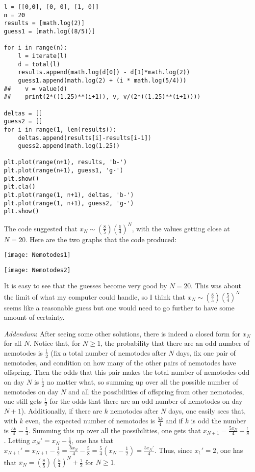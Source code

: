 \documentclass[11pt]{article}
\theoremstyle{definition}
\begin{document}
\begin{verbatim}
l = [[0,0], [0, 0], [1, 0]]
n = 20
results = [math.log(2)]
guess1 = [math.log((8/5))]

for i in range(n):
    l = iterate(l)
    d = total(l)
    results.append(math.log(d[0]) - d[1]*math.log(2))
    guess1.append(math.log(2) + (i * math.log(5/4)))
##    v = value(d)
##    print(2*((1.25)**(i+1)), v, v/(2*((1.25)**(i+1))))
    
deltas = []
guess2 = []
for i in range(1, len(results)):
    deltas.append(results[i]-results[i-1])
    guess2.append(math.log(1.25))

plt.plot(range(n+1), results, 'b-')
plt.plot(range(n+1), guess1, 'g-')
plt.show()
plt.cla()
plt.plot(range(1, n+1), deltas, 'b-')
plt.plot(range(1, n+1), guess2, 'g-')
plt.show()
\end{verbatim}
The code suggested that $x_N \sim \left(\frac{8}{5}\right)\left(\frac{5}{4}\right)^{N}$, with the values getting close at $N = 20$.  Here are the two graphs that the code produced:

\texttt{[image: Nemotodes1]}

\texttt{[image: Nemotodes2]}

It is easy to see that the guesses become very good by $N = 20$.  This was about the limit of what my computer could handle, so I think that $x_N \sim \left(\frac{8}{5}\right)\left(\frac{5}{4}\right)^{N}$ seems like a reasonable guess but one would need to go further to have some amount of certainty.

\emph{Addendum}: After seeing some other solutions, there is indeed a closed form for $x_N$ for all $N$.  Notice that, for $N \geq 1$, the probability that there are an odd number of nemotodes is $\frac{1}{2}$ (fix a total number of nemotodes after $N$ days, fix one pair of nemotodes, and condition on how many of the other pairs of nemotodes have offspring.  Then the odds that this pair makes the total number of nemotodes odd on day $N$ is $\frac{1}{2}$ no matter what, so summing up over all the possible number of nemotodes on day $N$ and all the possibilities of offspring from other nemotodes, one still gets $\frac{1}{2}$ for the odds that there are an odd number of nemotodes on day $N+1$).  Additionally, if there are $k$ nemotodes after $N$ days, one easily sees that, with $k$ even, the expected number of nemotodes is $\frac{5k}{4}$ and if $k$ is odd the number is $\frac{5k}{4}-\frac{1}{4}$.  Summing this up over all the possibilities, one gets that $x_{N+1} = \frac{5x_N}{4} - \frac{1}{8}$.  Letting $x_N' = x_N - \frac{1}{2}$, one has that $x_{N+1}' = x_{N+1} -\frac{1}{2} = \frac{5x_N}{4} - \frac{5}{8} = \frac{5}{4}\left(x_N-\frac{1}{2}\right) = \frac{5x_N'}{4}$.  Thus, since $x_1' = 2$, one has that $x_N = \left(\frac{8}{5}\right)\left(\frac{5}{4}\right)^{N} + \frac{1}{2}$ for $N \geq 1$.
\end{document}

